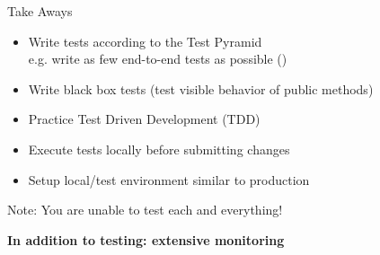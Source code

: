 \begin{frame}{Take Aways}
\begin{itemize}
	\item Write tests according to the Test Pyramid\\
	e.g. write as few end-to-end tests as possible () 
	\item Write black box tests (test visible behavior of public methods)
	\item Practice Test Driven Development (TDD)
	\item Execute tests locally before submitting changes
	\item Setup local/test environment similar to production
\end{itemize}
Note: You are unable to test each and everything!

\vspace{1cm}

\centerline{\textbf{In addition to testing: extensive monitoring}}
\end{frame}

